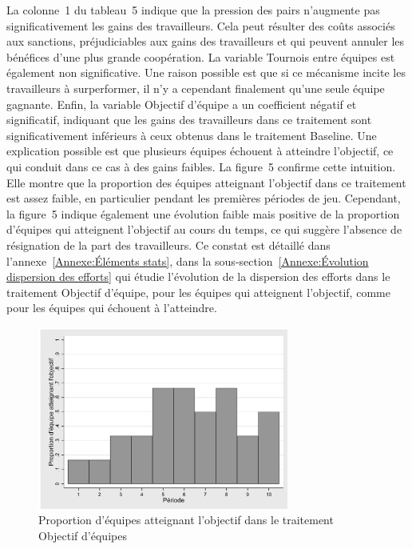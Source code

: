 \begin{Article}
\begin{refsection}[Lebourges]
\begin{table}
\end{table}

La colonne~1 du tableau~5 indique que la pression des pairs n'augmente
pas significativement les gains des travailleurs. Cela peut résulter des
coûts associés aux sanctions, préjudiciables aux gains des travailleurs
et qui peuvent annuler les bénéfices d'une plus grande coopération. La
variable Tournois entre équipes est également non significative. Une
raison possible est que si ce mécanisme incite les travailleurs à
surperformer, il n'y a cependant finalement qu'une seule équipe
gagnante. Enfin, la variable Objectif d'équipe a un coefficient négatif
et significatif, indiquant que les gains des travailleurs dans ce
traitement sont significativement inférieurs à ceux obtenus dans le
traitement Baseline. Une explication possible est que plusieurs équipes
échouent à atteindre l'objectif, ce qui conduit dans ce cas à des gains
faibles. La figure~5 confirme cette intuition. Elle montre que la
proportion des équipes atteignant l'objectif dans ce traitement est
assez faible, en particulier pendant les premières périodes de jeu.
Cependant, la figure~5 indique également une évolution faible mais
positive de la proportion d'équipes qui atteignent l'objectif au cours
du temps, ce qui suggère l'absence de résignation de la part des
travailleurs. Ce constat est détaillé dans l'annexe~\ref{Annexe:Éléments stats}, dans la sous-section~\ref{Annexe:Évolution dispersion des efforts} qui étudie l'évolution de la dispersion des efforts dans le traitement Objectif d'équipe, pour les équipes qui
atteignent l'objectif, comme pour les équipes qui échouent à l'atteindre.

\begin{figure}[h]
    \centering
    \caption{Proportion d'équipes atteignant l'objectif dans le
traitement Objectif d'équipes}
    \includegraphics[height=6cm]{05_graph5.png}
\end{figure}


\end{refsection}
\end{Article}
